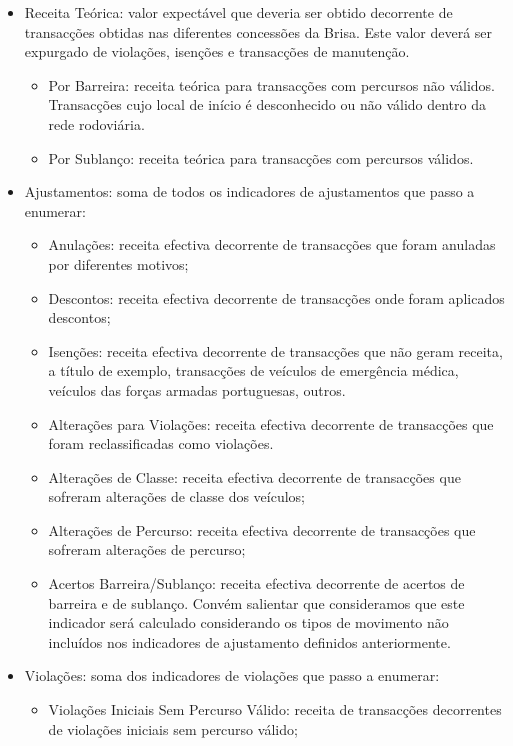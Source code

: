 \begin{itemize}  
	\item Receita Teórica: valor expectável que deveria ser obtido decorrente de transacções obtidas nas diferentes concessões da Brisa. Este valor deverá ser expurgado de violações, isenções e transacções de manutenção.
	\begin{itemize}
	\item Por Barreira: receita teórica para transacções com percursos não válidos. Transacções cujo local de início é desconhecido ou não válido dentro da rede rodoviária.
	\item Por Sublanço: receita teórica para transacções com percursos válidos.  
	\end{itemize}
	\item Ajustamentos: soma de todos os indicadores de ajustamentos que passo a enumerar:
	\begin{itemize}
	\item Anulações: receita efectiva decorrente de transacções que foram anuladas por diferentes motivos;
	\item Descontos: receita efectiva decorrente de transacções onde foram aplicados descontos;
	\item Isenções: receita efectiva decorrente de transacções que não geram receita, a título de exemplo, transacções de veículos de emergência médica, veículos das forças armadas portuguesas, outros. 
	\item Alterações para Violações: receita efectiva decorrente de transacções que foram reclassificadas como violações.
	\item	Alterações de Classe: receita efectiva decorrente de transacções que sofreram alterações de classe dos veículos;
	\item Alterações de Percurso: receita efectiva decorrente de transacções que sofreram alterações de percurso;
	\item Acertos Barreira/Sublanço: receita efectiva decorrente de acertos de barreira e de sublanço. Convém salientar que consideramos que este indicador será calculado considerando os tipos de movimento não incluídos nos indicadores de ajustamento definidos anteriormente.
	\end{itemize}
	\item Violações: soma dos indicadores de violações que passo a enumerar:
	\begin{itemize}
	\item Violações Iniciais Sem Percurso Válido: receita de transacções decorrentes de violações iniciais sem percurso válido;

\end{itemize}
\end{itemize}
